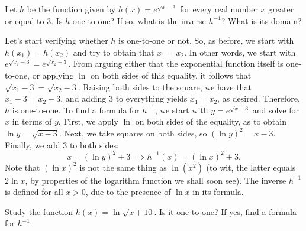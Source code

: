 \documentclass[nooutcomes]{ximera}
\begin{document}
\begin{example}
  Let $h$ be the function given by $h(x) = e^{\sqrt{x-3}}$ for every real number $x$ greater or equal to $3$. Is $h$ one-to-one? If so, what is the inverse $h^{-1}$? What is its domain?

  \begin{explanation}
    Let's start verifying whether $h$ is one-to-one or not. So, as before, we start with $h(x_1)=h(x_2)$ and try to obtain that $x_1=x_2$. In other words, we start with $e^{\sqrt{x_1-3}} = e^{\sqrt{x_2-3}}$. From arguing either that the exponential function itself is one-to-one, or applying $\ln$ on both sides of this equality, it follows that $\sqrt{x_1-3}=\sqrt{x_2-3}$. Raising both sides to the square, we have that $x_1-3=x_2-3$, and adding $3$ to everything yields $x_1=x_2$, as desired. Therefore, $h$ is one-to-one. To find a formula for $h^{-1}$, we start with $y= e^{\sqrt{x-3}}$ and solve for $x$ in terms of $y$. First, we apply $\ln$ on both sides of the equality, as to obtain $\ln y = \sqrt{x-3}$. Next, we take squares on both sides, so $(\ln y)^2 = x-3$. Finally, we add $3$ to both sides: $$x = (\ln y)^2+3 \implies h^{-1}(x) = (\ln x)^2+3.$$Note that $(\ln x)^2$ is not the same thing as $\ln(x^2)$ (to wit, the latter equals $2\ln x$, by properties of the logarithm function we shall soon see). The inverse $h^{-1}$ is defined for all $x>0$, due to the presence of $\ln x$ in its formula.
  \end{explanation}
\end{example}

\begin{exploration}
  Study the function $h(x) = \ln \sqrt{x+10}$. Is it one-to-one? If yes, find a formula for $h^{-1}$.
\end{exploration}
\end{document}
